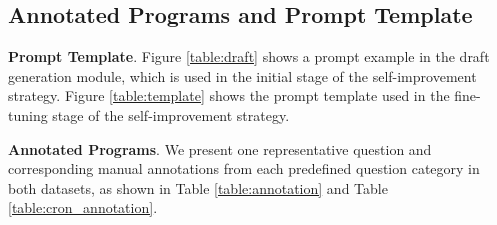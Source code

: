 \documentclass[10pt, a4paper]{article}
\begin{document}
\subsection{Annotated Programs and Prompt Template}\label{app:annot}

\textbf{Prompt Template}. Figure \ref{table:draft} shows a prompt example in the draft generation module, which is used in the initial stage of the self-improvement strategy. Figure \ref{table:template} shows the prompt template used in the fine-tuning stage of the self-improvement strategy.

\textbf{Annotated Programs}. We present one representative question and corresponding manual annotations from each predefined question category in both datasets, as shown in Table \ref{table:annotation} and Table \ref{table:cron_annotation}.
\end{document}
